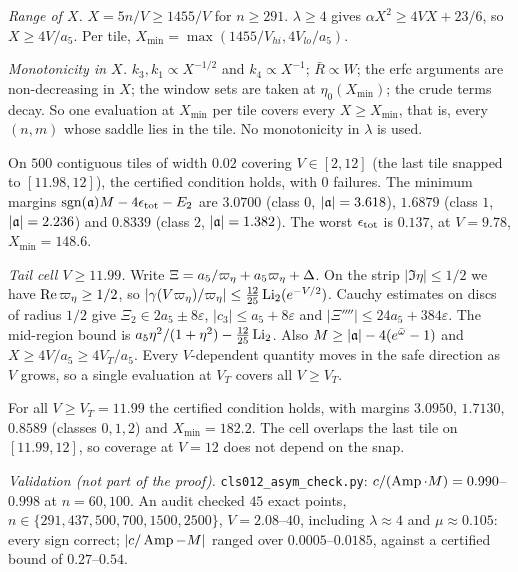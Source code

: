 \emph{Range of $X$.} $X=5n/V\ge1455/V$ for $n\ge291$. $\lambda\ge4$ gives $\alpha X^2\ge4VX+23/6$, so $X\ge4V/a_5$. Per
tile, $X_{\min}=\max(1455/V_{hi},4V_{lo}/a_5)$.

\emph{Monotonicity in $X$.} $k_3,k_1\propto X^{-1/2}$ and $k_4\propto X^{-1}$; $\bar R\propto W$; the erfc arguments are
non-decreasing in $X$; the window sets are taken at $\eta_0(X_{\min})$; the crude terms decay. So one evaluation at
$X_{\min}$ per tile covers every $X\ge X_{\min}$, that is, every $(n,m)$ whose saddle lies in the tile. No monotonicity in
$\lambda$ is used.

\begin{lemma}\label{lem:lap012-tiles}
On $500$ contiguous tiles of width $0.02$ covering $V\in[2,12]$ (the last tile snapped to $[11.98,12]$), the certified
condition holds, with $0$ failures. The minimum margins $\operatorname{sgn}(\mathfrak a)M-4\epsilon_{\rm tot}-E_2$ are $3.0700$ (class $0$,
$|\mathfrak a|=3.618$), $1.6879$ (class $1$, $|\mathfrak a|=2.236$) and $0.8339$ (class $2$, $|\mathfrak a|=1.382$). The worst $\epsilon_{\rm tot}$ is
$0.137$, at $V=9.78$, $X_{\min}=148.6$.
\end{lemma}

\emph{Tail cell $V\ge11.99$.} Write $\Xi=a_5/\varpi_\eta+a_5\varpi_\eta+\Delta$. On the strip $|\Im\eta|\le1/2$ we have
$\operatorname{Re}\varpi_\eta\ge1/2$, so $|\gamma(V\varpi_\eta)/\varpi_\eta|\le\frac{12}{25}\operatorname{Li}_2(e^{-V/2})$. Cauchy estimates on discs of radius
$1/2$ give $\Xi_2\in2a_5\pm8\varepsilon$, $|c_3|\le a_5+8\varepsilon$ and $|\Xi''''|\le24a_5+384\varepsilon$. The
mid-region bound is $a_5\eta^2/(1+\eta^2)-\frac{12}{25}\operatorname{Li}_2$. Also $M\ge|\mathfrak a|-4(e^{\bar\omega}-1)$ and
$X\ge4V/a_5\ge4V_T/a_5$. Every $V$-dependent quantity moves in the safe direction as $V$ grows, so a single evaluation at
$V_T$ covers all $V\ge V_T$.

\begin{lemma}\label{lem:lap012-tail}
For all $V\ge V_T=11.99$ the certified condition holds, with margins $3.0950$, $1.7130$, $0.8589$ (classes $0,1,2$) and
$X_{\min}=182.2$. The cell overlaps the last tile on $[11.99,12]$, so coverage at $V=12$ does not depend on the snap.
\end{lemma}

\emph{Validation (not part of the proof).} \texttt{cls012\_asym\_check.py}: $c/(\operatorname{Amp}\cdot M)=0.990$--$0.998$ at
$n=60,100$. An audit checked $45$ exact points, $n\in\{291,437,500,700,1500,2500\}$, $V=2.08$--$40$, including
$\lambda\approx4$ and $\mu\approx0.105$: every sign correct; $|c/\operatorname{Amp}-M|$ ranged over $0.0005$--$0.0185$, against a
certified bound of $0.27$--$0.54$.

